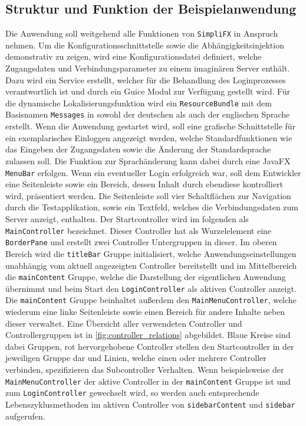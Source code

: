 \subsection{Struktur und Funktion der Beispielanwendung}
Die Anwendung soll weitgehend alle Funktionen von \texttt{SimpliFX} in Anspruch nehmen. Um die Konfigurationsschnittstelle sowie die Abhängigkeitsinjektion demonstrativ zu zeigen, wird eine Konfigurationsdatei definiert, welche Zugangsdaten und Verbindungsparameter zu einem imaginären Server enthält. Dazu wird ein Service erstellt, welcher für die Behandlung des Loginprozesses verantwortlich ist und durch ein Guice Modul zur Verfügung gestellt wird. Für die dynamische Lokalisierungsfunktion wird ein \texttt{ResourceBundle} mit dem Basisnamen \texttt{Messages} in sowohl der deutschen als auch der englischen Sprache erstellt. Wenn die Anwendung gestartet wird, soll eine grafische Schnittstelle für ein exemplarisches Einloggen angezeigt werden, welche Standardfunktionen wie das Eingeben der Zugangsdaten sowie die Änderung der Standardsprache zulassen soll. Die Funktion zur Sprachänderung kann dabei durch eine JavaFX \texttt{MenuBar} erfolgen. Wenn ein eventueller Login erfolgreich war, soll dem Entwickler eine Seitenleiste sowie ein Bereich, dessen Inhalt durch ebendiese kontrolliert wird, präsentiert werden. Die Seitenleiste soll vier Schaltflächen zur Navigation durch die Testapplikation, sowie ein Textfeld, welches die Verbindungsdaten zum Server anzeigt, enthalten. Der Startcontroller wird im folgenden als \texttt{MainController} bezeichnet. 
Dieser Controller hat als Wurzelelement eine \texttt{BorderPane} und erstellt zwei Controller Untergruppen in dieser. Im oberen Bereich wird die \texttt{titleBar} Gruppe initialisiert, welche Anwendungseinstellungen unabhängig vom aktuell angezeigten Controller bereitstellt und im Mittelbereich die \texttt{mainContent} Gruppe, welche die Darstellung der eigentlichen Anwendung übernimmt und beim Start den \texttt{LoginController} als aktiven Controller anzeigt. Die \texttt{mainContent} Gruppe beinhaltet außerdem den \texttt{MainMenuController}, welche wiederum eine linke Seitenleiste sowie einen Bereich für andere Inhalte neben dieser verwaltet. Eine Übersicht aller verwendeten Controller und Controllergruppen ist in \autoref{fig:controller_relations} abgebildet. Blaue Kreise sind dabei Gruppen, rot hervorgehobene Controller stellen den Startcontroller in der jeweiligen Gruppe dar und Linien, welche einen oder mehrere Controller verbinden, spezifizieren das Subcontroller Verhalten. Wenn beispielsweise der \texttt{MainMenuController} der aktive Controller in der \texttt{mainContent} Gruppe ist und zum \texttt{LoginController} gewechselt wird, so werden auch entsprechende Lebenszyklusmethoden im aktiven Controller von \texttt{sidebarContent} und \texttt{sidebar} aufgerufen.
